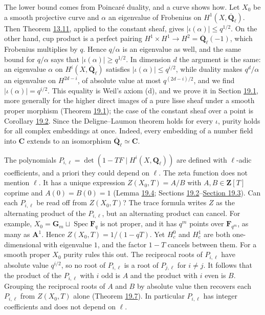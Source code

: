 \documentclass[11pt]{article}
\begin{document}
The lower bound comes from Poincaré duality, and a curve shows how. Let \(X_0\) be a smooth projective curve and \(\alpha\) an eigenvalue of Frobenius on \(H^1(X,\overline{\mathbf Q}_\ell)\). Then Theorem \hyperref[bp38]{13.11}, applied to the constant sheaf, gives \(|\iota(\alpha)|\le q^{1/2}\). On the other hand, cup product is a perfect pairing \(H^1\times H^1\to H^2=\overline{\mathbf Q}_\ell(-1)\), which Frobenius multiplies by \(q\). Hence \(q/\alpha\) is an eigenvalue as well, and the same bound for \(q/\alpha\) says that \(|\iota(\alpha)|\ge q^{1/2}\). In dimension \(d\) the argument is the same: an eigenvalue \(\alpha\) on \(H^i(X,\overline{\mathbf Q}_\ell)\) satisfies \(|\iota(\alpha)|\le q^{i/2}\), while duality makes \(q^d/\alpha\) an eigenvalue on \(H^{2d-i}\), of absolute value at most \(q^{(2d-i)/2}\), and we find \(|\iota(\alpha)|=q^{i/2}\). This equality is Weil's axiom (d), and we prove it in Section \hyperref[bp321]{19.1}, more generally for the higher direct images of a pure lisse sheaf under a smooth proper morphism (Theorem \hyperref[bp323]{19.1}); the case of the constant sheaf over a point is Corollary \hyperref[bp326]{19.2}. Since the Deligne–Laumon theorem holds for every \(\iota\), purity holds for all complex embeddings at once. Indeed, every embedding of a number field into \(\mathbf C\) extends to an isomorphism \(\overline{\mathbf Q}_\ell\simeq\mathbf C\).

The polynomials \(P_{i,\ell}=\det(1-TF\mid H^i(X,\mathbf Q_\ell))\) are defined with \(\ell\)-adic coefficients, and a priori they could depend on \(\ell\). The zeta function does not mention \(\ell\). It has a unique expression \(Z(X_0,T)=A/B\) with \(A,B\in\mathbf Z[T]\) coprime and \(A(0)=B(0)=1\) (Lemma \hyperref[bp333]{19.4}; Sections \hyperref[bp328]{19.2}–\hyperref[bp336]{Section 19.3}). Can each \(P_{i,\ell}\) be read off from \(Z(X_0,T)\)? The trace formula writes \(Z\) as the alternating product of the \(P_{i,\ell}\), but an alternating product can cancel. For example, \(X_0=\mathbf G_m\sqcup
\operatorname{Spec}\mathbf F_q\) is not proper, and it has \(q^m\) points over \(\mathbf F_{q^m}\), as many as \(\mathbf A^1\). Hence \(Z(X_0,T)=1/(1-qT)\). Yet \(H^0_c\) and \(H^1_c\) are both one-dimensional with eigenvalue \(1\), and the factor \(1-T\) cancels between them. For a smooth proper \(X_0\) purity rules this out. The reciprocal roots of \(P_{i,\ell}\) have absolute value \(q^{i/2}\), so no root of \(P_{i,\ell}\) is a root of \(P_{j,\ell}\) for \(i\neq j\). It follows that the product of the \(P_{i,\ell}\) with \(i\) odd is \(A\) and the product with \(i\) even is \(B\). Grouping the reciprocal roots of \(A\) and \(B\) by absolute value then recovers each \(P_{i,\ell}\) from \(Z(X_0,T)\) alone (Theorem \hyperref[bp342]{19.7}). In particular \(P_{i,\ell}\) has integer coefficients and does not depend on \(\ell\).
\end{document}
